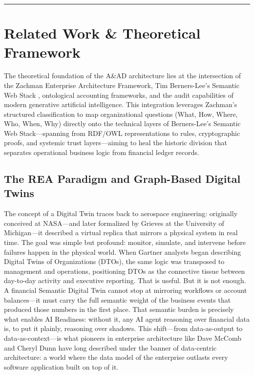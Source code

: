 \documentclass[12pt, a4paper]{article}
\begin{document}
\hrule
\vspace{1em}

\section{Related Work \& Theoretical Framework}

The theoretical foundation of the A\&AD architecture lies at the intersection of the Zachman Enterprise Architecture Framework, Tim Berners-Lee's Semantic Web Stack \cite{bernerslee2001}, ontological accounting frameworks, and the audit capabilities of modern generative artificial intelligence. This integration leverages Zachman's structured classification to map organizational questions (What, How, Where, Who, When, Why) directly onto the technical layers of Berners-Lee's Semantic Web Stack---spanning from RDF/OWL representations to rules, cryptographic proofs, and systemic trust layers---aiming to heal the historic division that separates operational business logic from financial ledger records.

\subsection{The REA Paradigm and Graph-Based Digital Twins}

The concept of a Digital Twin traces back to aerospace engineering: originally conceived at NASA---and later formalized by Grieves \cite{grieves2002} at the University of Michigan---it described a virtual replica that mirrors a physical system in real time. The goal was simple but profound: monitor, simulate, and intervene before failures happen in the physical world. When Gartner analysts began describing Digital Twins of Organizations (DTOs), the same logic was transposed to management and operations, positioning DTOs as the connective tissue between day-to-day activity and executive reporting. That is useful. But it is not enough. A financial Semantic Digital Twin cannot stop at mirroring workflows or account balances---it must carry the full semantic weight of the business events that produced those numbers in the first place. That semantic burden is precisely what enables AI Readiness: without it, any AI agent reasoning over financial data is, to put it plainly, reasoning over shadows. This shift---from data-as-output to data-as-context---is what pioneers in enterprise architecture like Dave McComb \cite{mccomb2019} and Cheryl Dunn \cite{dunn2004} have long described under the banner of data-centric architecture: a world where the data model of the enterprise outlasts every software application built on top of it.
\end{document}
